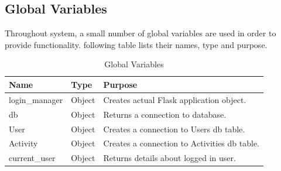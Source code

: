 \documentclass{article}[12pt,a4paper]
\begin{document}
\subsection{Global Variables}
Throughout system, a small number of global variables are used in order to provide functionality. following table lists their names, type and purpose.
\begin{table}[h]
\begin{tabular}{|l|l|l|}
\hline
\textbf{Name} & \textbf{Type} & \textbf{Purpose}                        \\ \hline
login\_manager                    & Object                 & Creates actual Flask application object.     \\ \hline
db                     & Object                 & Returns a connection to database.            \\ \hline
User                   & Object                 & Creates a connection to Users db table.      \\ \hline
Activity               & Object                 & Creates a connection to Activities db table. \\ \hline
current\_user          & Object                 & Returns details about logged in user.        \\ \hline
\end{tabular}
\caption{Global Variables}
\end{table}
\end{document}
